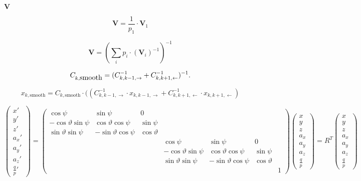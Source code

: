 \documentclass{article}
\begin{document}
$\mathbf{V}$
\pagebreak

\[ \mathbf{V} = \frac{1}{p_{1}}\cdot\mathbf{V}_{1} \]
\pagebreak

\[ \mathbf{V} = \left( \sum_{i} p_{i} \cdot \left( \mathbf{V}_{i}\right)^{-1} \right)^{-1} \]
\pagebreak

\[ C_{k,\mbox{smooth}} = (C_{k,k-1,\rightarrow}^{-1}+C_{k,k+1,\leftarrow}^{-1})^{-1}. \\ \]
\pagebreak

\[ x_{k,\mbox{smooth}} = C_{k,\mbox{smooth}} \cdot ((C_{k,k-1,\rightarrow}^{-1}\cdot x_{k,k-1,\rightarrow} + C_{k,k+1,\leftarrow}^{-1}\cdot x_{k,k+1,\leftarrow}) \]
\pagebreak

\[ \left(\begin{array}{c} x'\\ y'\\ z'\\ a_{x}'\\ a_{y}'\\ a_{z}'\\ \frac{q}{p}'\end{array}\right)=\left(\begin{array}{ccccccc} \cos\psi & \sin\psi & 0\\ -\cos\vartheta\sin\psi & \cos\vartheta\cos\psi & \sin\psi\\ \sin\vartheta\sin\psi & -\sin\vartheta\cos\psi & \cos\vartheta\\ & & & \cos\psi & \sin\psi & 0\\ & & & -\cos\vartheta\sin\psi & \cos\vartheta\cos\psi & \sin\psi\\ & & & \sin\vartheta\sin\psi & -\sin\vartheta\cos\psi & \cos\vartheta\\ & & & & & & 1\end{array}\right)\left(\begin{array}{c} x\\ y\\ z\\ a_{x}\\ a_{y}\\ a_{z}\\ \frac{q}{p}\end{array}\right)=R^{T}\left(\begin{array}{c} x\\ y\\ z\\ a_{x}\\ a_{y}\\ a_{z}\\ \frac{q}{p}\end{array}\right)\]
\pagebreak
\end{document}
